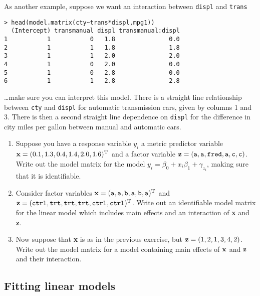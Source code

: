 \documentclass[10pt] {article}
\newcommand{\ts}{^{\rm T}}
\theoremstyle{definition}
\begin{document}
As another example, suppose we want an interaction between {\tt displ} and {\tt trans}
{\small \begin{verbatim}
> head(model.matrix(cty~trans*displ,mpg1))
  (Intercept) transmanual displ transmanual:displ
1           1           0   1.8               0.0
2           1           1   1.8               1.8
3           1           1   2.0               2.0
4           1           0   2.0               0.0
5           1           0   2.8               0.0
6           1           1   2.8               2.8
\end{verbatim}}
\noindent \ldots make sure you can interpret this model. There is a straight line relationship between {\tt cty} and {\tt displ} for automatic transmission cars, given by columns 1 and 3. There is then a second straight line dependence on {\tt displ} for the difference in city miles per gallon between manual and automatic cars. 

\begin{enumerate}
\item Suppose you have a response variable $y_i$ a metric predictor variable ${\bf x} = (0.1, 1.3, 0.4, 1.4, 2.0 , 1.6)\ts$ and a factor variable ${\bf z} = ({\tt a}, {\tt a},{\tt fred},{\tt a},{\tt c},{\tt c})$. Write out the model matrix for the model $y_i = \beta_0 + x_i \beta_1 + \gamma_{z_i}$, making sure that it is identifiable.
\item Consider factor variables ${\bf x} = ({\tt a}, {\tt a}, {\tt b},{\tt a}, {\tt b},{\tt a})\ts$ and ${\bf z} = ({\tt ctrl},{\tt trt},{\tt trt},{\tt trt},{\tt ctrl},{\tt ctrl})\ts$. Write out an identifiable model matrix for the linear model which includes main effects and an interaction of {\bf x} and {\bf z}. 
\item Now suppose that {\bf x} is as in the previous exercise, but ${\bf z}=(1,2,1,3,4,2)$. Write out the model matrix for a model containing main effects of ${\bf x} $ and ${\bf z}$ and their interaction. 
\end{enumerate}

\subsection{Fitting linear models}
\end{document}
